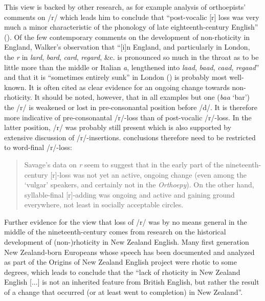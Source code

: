 This view is backed by other research, as for example  analysis of orthoepists’ comments on /r/ which leads him to conclude that “post-vocalic [r] loss was very much a minor characteristic of the phonology of late eighteenth-century English” (\citeyear[261]{Jones2006}). Of the few contemporary comments on the development of non-rhoticity in England, Walker’s observation that “[i]n England, and particularly in London, the \emph{r} in \emph{lard}, \emph{bard}, \emph{card}, \emph{regard}, \&c. is pronounced so much in the throat as to be little more than the middle or Italian \emph{a}, lengthened into \emph{laad}, \emph{baad}, \emph{caad}, \emph{regaad}” and that it is “sometimes entirely sunk” in London  (\citeyear[50]{Walker1791}) is probably most well-known. It is often cited as clear evidence for an ongoing change towards non-rhoticity. It should be noted, however, that in all examples but one (\emph{baa} ‘bar’) the /r/ is weakened or lost in pre-consonantal position before /d/. It is therefore more indicative of pre-consonantal /r/-loss than of post-vocalic /r/-loss. In the latter position, /r/ was probably still present which is also supported by  extensive discussion of /r/-insertions.  conclusions therefore need to be restricted to word-final /r/-loss:

\begin{quote}
Savage's data on \textit{r} seem to suggest that in the early part of the nineteenth-century [r]-loss was not yet an active, ongoing change (even among the ‘vulgar' speakers, and certainly not in the \textit{Orthoepy}). On the other hand, syllable-final [r]-adding was ongoing and active and gaining ground everywhere, not least in socially acceptable circles.
\end{quote}

Further evidence for the view that loss of /r/ was by no means general in the middle of the nineteenth-century comes from research on the historical development of (non-)rhoticity in New Zealand English. Many first generation New Zealand-born Europeans whose speech has been documented and analyzed as part of the Origins of New Zealand English project were rhotic to some degrees, which leads \citet[804]{Hay2005} to conclude that the “lack of rhoticity in New Zealand English [...] is not an inherited feature from British English, but rather the result of a change that occurred (or at least went to completion) in New Zealand”.

